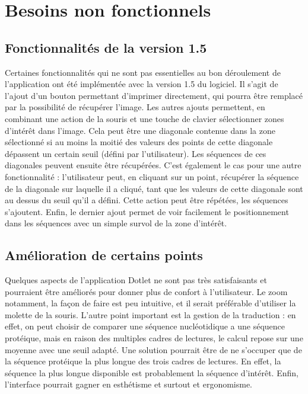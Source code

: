 \documentclass{report}
\begin{document}
\section{Besoins non fonctionnels}

\subsection{Fonctionnalités de la version 1.5}
Certaines fonctionnalités qui ne sont pas essentielles au bon déroulement de l'application ont été implémentée avec la version 1.5 du logiciel. Il s'agit de l'ajout d'un bouton permettant d'imprimer directement, qui pourra être remplacé par la possibilité de récupérer l'image. Les autres ajouts permettent, en combinant une action de la souris et une touche de clavier sélectionner zones d'intérêt dans l'image. Cela peut être une diagonale contenue dans la zone sélectionné si au moins la moitié des valeurs des points de cette diagonale dépassent un certain seuil (défini par l'utilisateur). Les séquences de ces diagonales peuvent ensuite être récupérées. C'est également le cas pour une autre fonctionnalité : l'utilisateur peut, en cliquant sur un point, récupérer la séquence de la diagonale sur laquelle il a cliqué, tant que les valeurs de cette diagonale sont au dessus du seuil qu'il a défini. Cette action peut être répétées, les séquences s'ajoutent. Enfin, le dernier ajout permet de voir facilement le positionnement dans les séquences avec un simple survol de la zone d'intérêt.

\subsection{Amélioration de certains points}
Quelques aspects de l'application Dotlet ne sont pas très satisfaisants et pourraient être améliorés pour donner plus de confort à l'utilisateur. Le zoom notamment, la façon de faire est peu intuitive, et il serait préférable d'utiliser la molette de la souris. L'autre point important est la gestion de la traduction : en effet, on peut choisir de comparer une séquence nucléotidique a une séquence protéique, mais en raison des multiples cadres de lectures, le calcul repose sur une moyenne avec une seuil adapté. Une solution pourrait être de ne s'occuper que de la séquence protéique la plus longue des trois cadres de lectures. En effet, la séquence la plus longue disponible est probablement la séquence d'intérêt. Enfin, l'interface pourrait gagner en esthétisme et surtout et ergonomisme.
\end{document}
